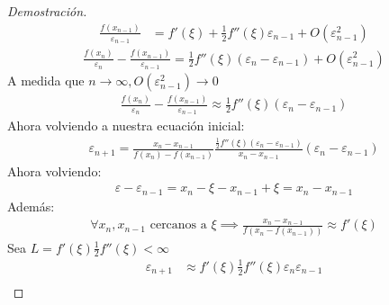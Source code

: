 \documentclass{article}
\begin{document}
\begin{proof}[Demostración]
\begin{equation}
\begin{split}
            \frac{f(x_{n-1})}{\varepsilon _{n-1}} &=f'(\xi )+\frac{1}{2}f''(\xi )\varepsilon _{n-1}+O(\varepsilon _{n-1}^{2})
        \end{split}
    \end{equation}
    \begin{equation}
        \begin{split}
            \frac{f(x_{n})}{\varepsilon _{n}}-\frac{f(x_{n-1})}{\varepsilon _{n-1}}
            = \frac{1}{2}f''(\xi )(\varepsilon _{n}-\varepsilon _{n-1})+O(\varepsilon _{n-1}^{2})
        \end{split}
    \end{equation}
    A medida que $n \to \infty,O(\varepsilon _{n-1}^{2}) \to 0$
    \begin{equation}
        \begin{split}
            \frac{f(x_{n})}{\varepsilon _{n}}-\frac{f(x_{n-1})}{\varepsilon _{n-1}}
            \approx \frac{1}{2}f''(\xi )(\varepsilon _{n}-\varepsilon _{n-1})
        \end{split}
    \end{equation}
    Ahora volviendo a nuestra ecuación inicial:
    \begin{equation}
        \begin{split}
            \varepsilon _{n+1} = \frac{x_{n}-x_{n-1}}{f(x_{n})-f(x_{n-1})}
            \frac{\frac{1}{2}f''(\xi )(\varepsilon _{n}-\varepsilon _{n-1})}{x_{n}-x_{n-1}}(\varepsilon _{n}-\varepsilon _{n-1})
        \end{split}
    \end{equation}
    Ahora volviendo:
    \begin{equation}
        \begin{split}
            \varepsilon -\varepsilon _{n-1} = x_{n}-\xi -x_{n-1}+\xi =x_{n}-x_{n-1}
        \end{split}
    \end{equation}
    Además:
    \begin{equation}
        \begin{split}
            \forall x_{n},x_{n-1} \text{ cercanos a }\xi \implies \frac{x_{n}-x_{n-1}}{f(x_{n}-f(x_{n-1}))} \approx f'(\xi )
        \end{split}
    \end{equation}
    Sea $L=f'(\xi )\frac{1}{2}f''(\xi )<\infty$
    \begin{equation}
        \begin{split}
            \varepsilon _{n+1} &\approx f'(\xi )\frac{1}{2} f''(\xi )\varepsilon _{n}\varepsilon _{n-1}\\

\end{split}
\end{equation}
\end{proof}
\end{document}
